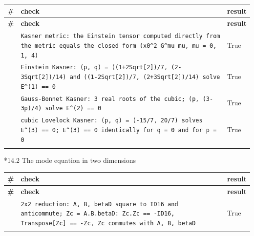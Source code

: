 \documentclass[10pt,a4paper]{article}
\makeatletter
\renewcommand\subsubsection{\@startsection{subsubsection}{3}{\z@}{-3.25ex\@plus -1ex \@minus -.2ex}{1.5ex \@plus .2ex}{\normalfont\normalsize\bfseries\raggedright}}
\makeatother
\begin{document}
{\footnotesize
\begin{longtable}{>{\raggedright\arraybackslash}p{}>{\raggedright\arraybackslash}p{}>{\raggedright\arraybackslash}p{}}
\toprule
\textbf{\#} & \textbf{check} & \textbf{result} \\
\midrule\endfirsthead
\toprule
\textbf{\#} & \textbf{check} & \textbf{result} \\
\midrule\endhead
\endfoot
\bottomrule\endlastfoot
290 & \texttt{Kasner metric: the Einstein tensor computed directly from the metric equals the closed form (x0\textasciicircum{}2 G\textasciicircum{}mu\_\allowbreak{}mu, mu = 0, 1, 4)} & True \\
291 & \texttt{Einstein Kasner: (p, q) = ((1+2Sqrt[2])/\allowbreak{}7, (2-3Sqrt[2])/\allowbreak{}14) and ((1-2Sqrt[2])/\allowbreak{}7, (2+3Sqrt[2])/\allowbreak{}14) solve E\textasciicircum{}(1) == 0} & True \\
292 & \texttt{Gauss-Bonnet Kasner: 3 real roots of the cubic; (p, (3-3p)/\allowbreak{}4) solve E\textasciicircum{}(2) == 0} & True \\
293 & \texttt{cubic Lovelock Kasner: (p, q) = (-15/\allowbreak{}7, 20/\allowbreak{}7) solves E\textasciicircum{}(3) == 0; E\textasciicircum{}(3) == 0 identically for q = 0 and for p = 0} & True \\*
\end{longtable}}
\subsubsection*{14.2 The mode equation in two dimensions}
{\footnotesize
\begin{longtable}{>{\raggedright\arraybackslash}p{}>{\raggedright\arraybackslash}p{}>{\raggedright\arraybackslash}p{}}
\toprule
\textbf{\#} & \textbf{check} & \textbf{result} \\
\midrule\endfirsthead
\toprule
\textbf{\#} & \textbf{check} & \textbf{result} \\
\midrule\endhead
\endfoot
\bottomrule\endlastfoot
294 & \texttt{2x2 reduction: A, B, betaD square to ID16 and anticommute; Zc = A.B.betaD: Zc.Zc == -ID16, Transpose[Zc] == -Zc, Zc commutes with A, B, betaD} & True \\*
\end{longtable}}
\end{document}
